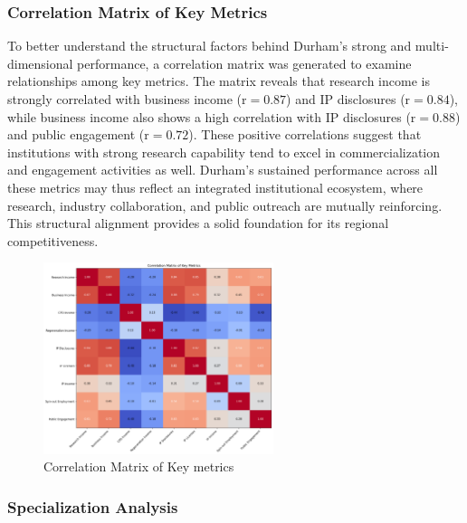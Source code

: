 \documentclass[journal,onecolumn, 10pt,draftclsnofoot]{IEEEtran}
\begin{document}
\subsubsection{Correlation Matrix of Key Metrics}

To better understand the structural factors behind Durham's strong and multi-dimensional performance, a correlation matrix \cite{pearson1895notes,fisher1915frequency} was generated to examine relationships among key metrics. The matrix reveals that research income is strongly correlated with business income ($\mathrm{r}=0.87$) and IP disclosures ($\mathrm{r}=0.84$), while business income also shows a high correlation with IP disclosures ($\mathrm{r}=0.88$) and public engagement ($\mathrm{r}=0.72$). These positive correlations suggest that institutions with strong research capability tend to excel in commercialization and engagement activities as well. Durham's sustained performance across all these metrics may thus reflect an integrated institutional ecosystem, where research, industry collaboration, and public outreach are mutually reinforcing. This structural alignment provides a solid foundation for its regional competitiveness.



\begin{figure}[h]
\centering
\includegraphics[width=0.6\textwidth]{Fig/figure36.correlation_matrix.png}
\caption{Correlation Matrix of Key metrics}
\label{fig:correlation-matrix}
\end{figure}

\subsubsection{Specialization Analysis}
\end{document}
